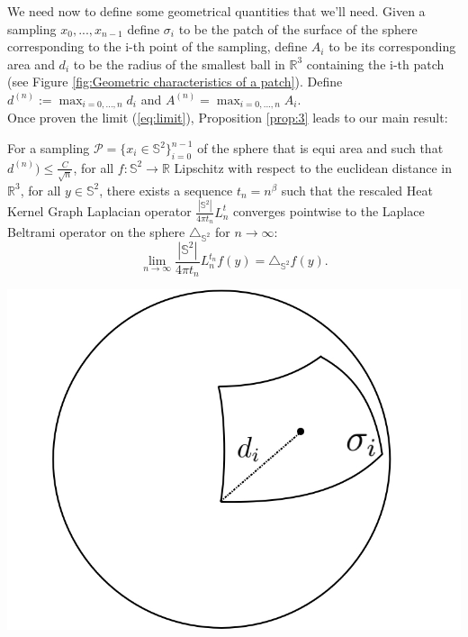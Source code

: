 We need now to define some geometrical quantities that we'll need. Given a sampling $x_0, ..., x_{n-1}$ define $\sigma_i$ to be the patch of the surface of the sphere corresponding to the i-th point of the sampling, define $A_i$ to be its corresponding area and $d_i$ to be the radius of the smallest ball in $\mathbb R^3$ containing the i-th patch (see Figure \ref{fig:Geometric characteristics of a patch}). Define $d^{(n)} := \max_{i=0, ..., n}d_i$ and $A^{(n)}=\max_{i=0, ..., n}A_i$.\\
Once proven the limit (\ref{eq:limit}), Proposition \ref{prop:3} leads to our main result:
\vspace{1cm}
\begin{theorem}
	For a sampling $\mathcal P = \{x_i\in\mathbb S^2\}_{i=0}^{n-1}$ of the sphere that is equi area and such that $d^{(n)})\leq \frac{C}{\sqrt{n}}$, for all $f: \mathbb S^2 \rightarrow \mathbb R$ Lipschitz with respect to the euclidean distance in $\mathbb R^3$, for all $y\in\mathbb S^2$, there exists a sequence $t_n = n^\beta$ such that the rescaled Heat Kernel Graph Laplacian operator $\frac{|\mathbb S^2|}{4\pi t_n}L^t_n$ converges pointwise to the Laplace Beltrami operator on the sphere $\triangle_{\mathbb S^2}$  for $n\to\infty$:
	$$ \lim_{n\to\infty}\frac{|\mathbb S^2|}{4\pi t_n} L_n^{t_n}f(y) =  \triangle_{\mathbb S^2}f(y).$$
	\label{theo:pointwise convergence in the healpix case}
\end{theorem}
\vspace{1cm}
\begin{minipage}{.4\textwidth}
	\centering
	\includegraphics[width=0.8\linewidth]{figs/chapter1/d_iA_i.jpg}
\end{minipage}%

